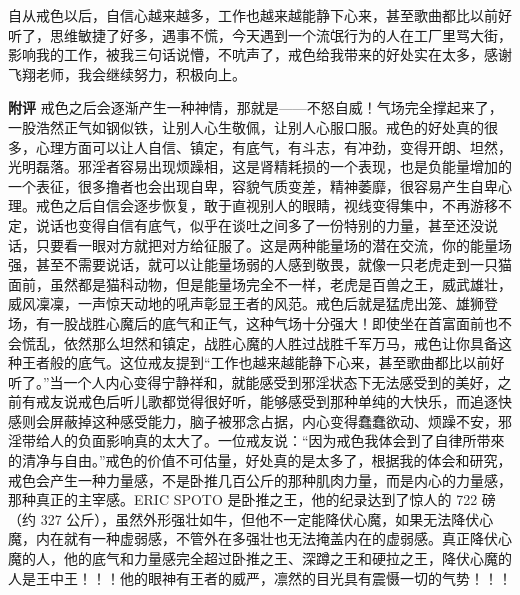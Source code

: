 \begin{case}
    自从戒色以后，自信心越来越多，工作也越来越能静下心来，甚至歌曲都比以前好听了，思维敏捷了好多，遇事不慌，今天遇到一个流氓行为的人在工厂里骂大街，影响我的工作，被我三句话说懵，不吭声了，戒色给我带来的好处实在太多，感谢飞翔老师，我会继续努力，积极向上。

    \textbf{附评} 戒色之后会逐渐产生一种神情，那就是——不怒自威！气场完全撑起来了，一股浩然正气如钢似铁，让别人心生敬佩，让别人心服口服。戒色的好处真的很多，心理方面可以让人自信、镇定，有底气，有斗志，有冲劲，变得开朗、坦然，光明磊落。邪淫者容易出现烦躁相，这是肾精耗损的一个表现，也是负能量增加的一个表征，很多撸者也会出现自卑，容貌气质变差，精神萎靡，很容易产生自卑心理。戒色之后自信会逐步恢复，敢于直视别人的眼睛，视线变得集中，不再游移不定，说话也变得自信有底气，似乎在谈吐之间多了一份特别的力量，甚至还没说话，只要看一眼对方就把对方给征服了。这是两种能量场的潜在交流，你的能量场强，甚至不需要说话，就可以让能量场弱的人感到敬畏，就像一只老虎走到一只猫面前，虽然都是猫科动物，但是能量场完全不一样，老虎是百兽之王，威武雄壮，威风凜凜，一声惊天动地的吼声彰显王者的风范。戒色后就是猛虎出笼、雄狮登场，有一股战胜心魔后的底气和正气，这种气场十分强大！即使坐在首富面前也不会慌乱，依然那么坦然和镇定，战胜心魔的人胜过战胜千军万马，戒色让你具备这种王者般的底气。这位戒友提到“工作也越来越能静下心来，甚至歌曲都比以前好听了。”当一个人内心变得宁静祥和，就能感受到邪淫状态下无法感受到的美好，之前有戒友说戒色后听儿歌都觉得很好听，能够感受到那种单纯的大快乐，而追逐快感则会屏蔽掉这种感受能力，脑子被邪念占据，内心变得蠢蠢欲动、烦躁不安，邪淫带给人的负面影响真的太大了。一位戒友说：“因为戒色我体会到了自律所带來的清净与自由。”戒色的价值不可估量，好处真的是太多了，根据我的体会和研究，戒色会产生一种力量感，不是卧推几百公斤的那种肌肉力量，而是内心的力量感，那种真正的主宰感。ERIC SPOTO 是卧推之王，他的纪录达到了惊人的 722 磅（约 327 公斤），虽然外形强壮如牛，但他不一定能降伏心魔，如果无法降伏心魔，内在就有一种虚弱感，不管外在多强壮也无法掩盖内在的虚弱感。真正降伏心魔的人，他的底气和力量感完全超过卧推之王、深蹲之王和硬拉之王，降伏心魔的人是王中王！！！他的眼神有王者的威严，凛然的目光具有震慑一切的气势！！！
\end{case}

